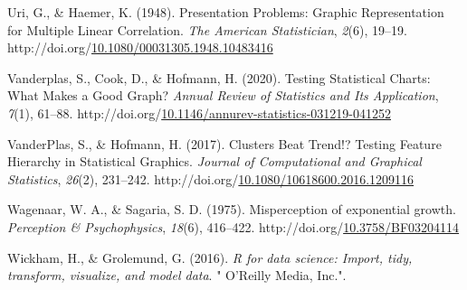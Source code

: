 \documentclass[print]{nuthesis}
\newlength{\cslhangindent}
\newenvironment{CSLReferences}%
{\setlength{\parindent}{0pt}%
\everypar{\setlength{\hangindent}{\cslhangindent}}\ignorespaces}%
{\par}
\begin{document}
\begin{CSLReferences}{1}{0}
\leavevmode\hypertarget{ref-uri_presentation_1948}{}%
Uri, G., \& Haemer, K. (1948). Presentation {Problems}: {Graphic} {Representation} for {Multiple} {Linear} {Correlation}. \emph{The American Statistician}, \emph{2}(6), 19--19. http://doi.org/\href{https://doi.org/10.1080/00031305.1948.10483416}{10.1080/00031305.1948.10483416}

\leavevmode\hypertarget{ref-vanderplas_testing_2020}{}%
Vanderplas, S., Cook, D., \& Hofmann, H. (2020). Testing {Statistical} {Charts}: {What} {Makes} a {Good} {Graph}? \emph{Annual Review of Statistics and Its Application}, \emph{7}(1), 61--88. http://doi.org/\href{https://doi.org/10.1146/annurev-statistics-031219-041252}{10.1146/annurev-statistics-031219-041252}

\leavevmode\hypertarget{ref-vanderplas_clusters_2017}{}%
VanderPlas, S., \& Hofmann, H. (2017). Clusters {Beat} {Trend}!? {Testing} {Feature} {Hierarchy} in {Statistical} {Graphics}. \emph{Journal of Computational and Graphical Statistics}, \emph{26}(2), 231--242. http://doi.org/\href{https://doi.org/10.1080/10618600.2016.1209116}{10.1080/10618600.2016.1209116}

\leavevmode\hypertarget{ref-wagenaar_misperception_1975}{}%
Wagenaar, W. A., \& Sagaria, S. D. (1975). Misperception of exponential growth. \emph{Perception \& Psychophysics}, \emph{18}(6), 416--422. http://doi.org/\href{https://doi.org/10.3758/BF03204114}{10.3758/BF03204114}

\leavevmode\hypertarget{ref-wickham2016r}{}%
Wickham, H., \& Grolemund, G. (2016). \emph{R for data science: Import, tidy, transform, visualize, and model data}. " O'Reilly Media, Inc.".

\end{CSLReferences}


\backmatter

% 






\end{document}
